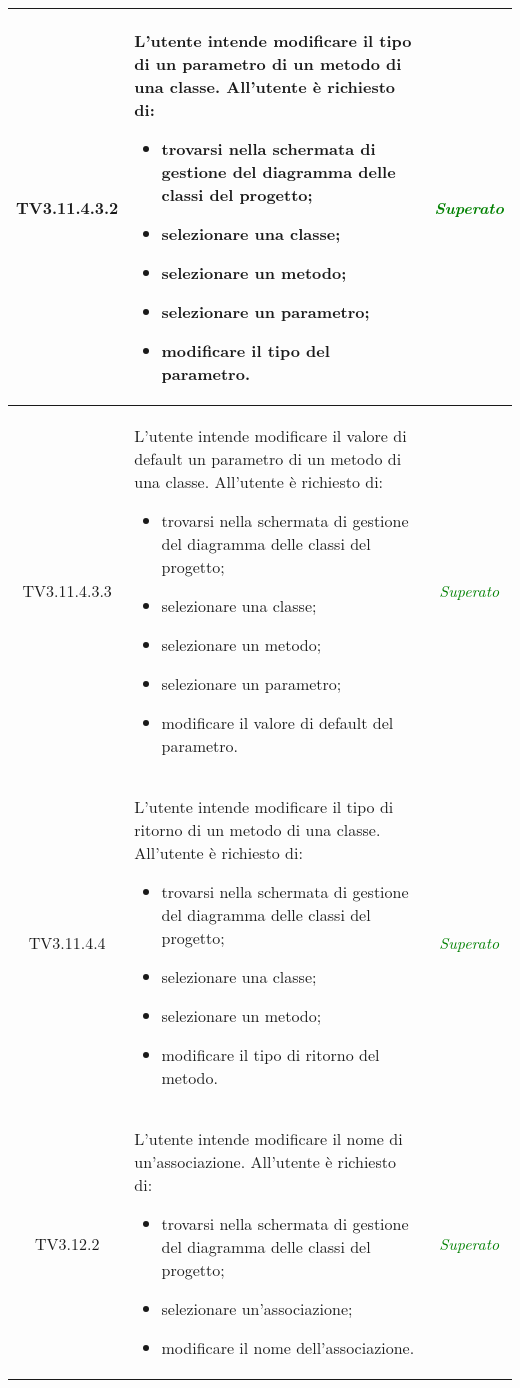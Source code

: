 \begin{longtable}{|c|>{}m{8cm}|c|}
\hypertarget{TV3.11.4.3.2}{TV3.11.4.3.2} & L'utente intende modificare il tipo di un parametro di un metodo di una classe.
All'utente è richiesto di:
\begin{itemize}
	\item trovarsi nella schermata di gestione del diagramma delle classi del progetto;
	\item selezionare una classe; 
	\item selezionare un metodo;
	\item selezionare un parametro;
	\item modificare il tipo del parametro.
\end{itemize} & \textcolor{Green}{\textit{Superato}}\\ \hline

\hypertarget{TV3.11.4.3.3}{TV3.11.4.3.3} & L'utente intende modificare il valore di default un parametro di un metodo di una classe.
All'utente è richiesto di:
\begin{itemize}
	\item trovarsi nella schermata di gestione del diagramma delle classi del progetto;
	\item selezionare una classe; 
	\item selezionare un metodo;
	\item selezionare un parametro;
	\item modificare il valore di default del parametro.
\end{itemize} & \textcolor{Green}{\textit{Superato}}\\ \hline

\hypertarget{TV3.11.4.4}{TV3.11.4.4} & L'utente intende modificare il tipo di ritorno di un metodo di una classe.
All'utente è richiesto di:
\begin{itemize}
	\item trovarsi nella schermata di gestione del diagramma delle classi del progetto;
	\item selezionare una classe;
	\item selezionare un metodo;
	\item modificare il tipo di ritorno del metodo.
\end{itemize} & \textcolor{Green}{\textit{Superato}}\\ \hline

\hypertarget{TV3.12.2}{TV3.12.2} & L'utente intende modificare il nome di un'associazione.
All'utente è richiesto di:
\begin{itemize}
	\item trovarsi nella schermata di gestione del diagramma delle classi del progetto;
	\item selezionare un'associazione;
	\item modificare il nome dell'associazione.
\end{itemize} & \textcolor{Green}{\textit{Superato}}\\ \hline


\end{longtable}
